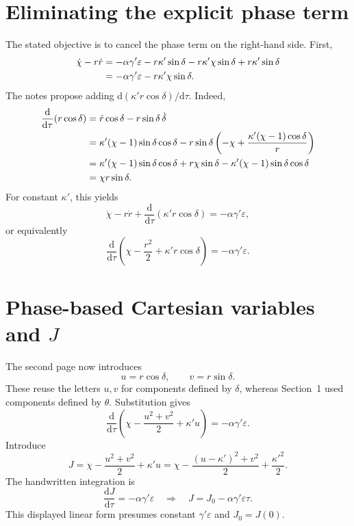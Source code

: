 \documentclass[11pt,a4paper]{article}
\newcommand{\dd}{\mathrm{d}}
\begin{document}
\section{Eliminating the explicit phase term}
The stated objective is to cancel the phase term on the right-hand side.
First,
\begin{align}
\dot\chi-r\dot r
&=-\alpha\gamma'\varepsilon-r\kappa'\sin\delta
-r\kappa'\chi\sin\delta+r\kappa'\sin\delta\notag\\
&=-\alpha\gamma'\varepsilon-r\kappa'\chi\sin\delta.
\end{align}
The notes propose adding $\dd(\kappa'r\cos\delta)/\dd\tau$.
Indeed,
\begin{align}
\frac{\dd}{\dd\tau}(r\cos\delta)
&=\dot r\cos\delta-r\sin\delta\,\dot\delta\notag\\
&=\kappa'(\chi-1)\sin\delta\cos\delta
-r\sin\delta\left(-\chi+\frac{\kappa'(\chi-1)\cos\delta}{r}\right)
\notag\\
&=\kappa'(\chi-1)\sin\delta\cos\delta+r\chi\sin\delta
-\kappa'(\chi-1)\sin\delta\cos\delta\notag\\
&=\chi r\sin\delta.
\end{align}
For constant $\kappa'$, this yields
\begin{equation}
\dot\chi-r\dot r+\frac{\dd}{\dd\tau}(\kappa'r\cos\delta)
=-\alpha\gamma'\varepsilon,
\end{equation}
or equivalently
\begin{equation}
\boxed{\frac{\dd}{\dd\tau}
\left(\chi-\frac{r^2}{2}+\kappa'r\cos\delta\right)
=-\alpha\gamma'\varepsilon.}
\end{equation}

\newpage
\section{Phase-based Cartesian variables and $J$}
The second page now introduces
\begin{equation}
u=r\cos\delta,\qquad v=r\sin\delta.
\label{eq:phasecoords}
\end{equation}
These reuse the letters $u,v$ for components defined by $\delta$, whereas
Section~1 used components defined by $\theta$.
Substitution gives
\begin{equation}
\frac{\dd}{\dd\tau}
\left(\chi-\frac{u^2+v^2}{2}+\kappa'u\right)
=-\alpha\gamma'\varepsilon.
\end{equation}
Introduce
\begin{equation}
\boxed{J=\chi-\frac{u^2+v^2}{2}+\kappa'u
=\chi-\frac{(u-\kappa')^2+v^2}{2}+\frac{\kappa'^2}{2}.}
\end{equation}
The handwritten integration is
\begin{equation}
\frac{\dd J}{\dd\tau}=-\alpha\gamma'\varepsilon
\quad\Longrightarrow\quad
\boxed{J=J_0-\alpha\gamma'\varepsilon\tau.}
\end{equation}
This displayed linear form presumes constant $\gamma'\varepsilon$ and
$J_0=J(0)$.
\end{document}
